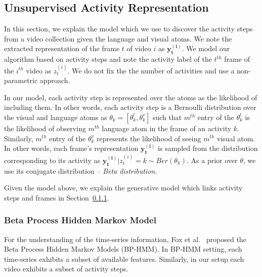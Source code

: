 

\subsection{Unsupervised Activity Representation}
\label{basics}
\label{learning}
In this section, we explain the model which we use to discover the activity steps from a video collection given the language and visual atoms. We note the extracted representation of the frame $t$ of video $i$ as $\mathbf{y^{(i)}_t}$. We model our algorithm based on activity steps and note the activity label of the $t^{th}$ frame of the $i^{th}$ video as $z^{(i)}_t$. We do not fix the the number of activities and use a non-parametric approach.


In our model, each activity step is represented over the atoms as the likelihood of including them. In other words, each activity step is a Bernoulli distribution over the visual and language atoms as $\theta_k=[\theta_k^l,\theta_k^v]$ such that $m^{th}$ entry of the $\theta_k^l$ is the likelihood of observing $m^{th}$ language atom in the frame of an activity $k$. Similarly, $m^{th}$ entry of the $\theta_k^v$ represents the likelihood of seeing $m^{th}$ visual atom. In other words, each frame's representation $\mathbf{y^{(i)}_t}$ is sampled from the distribution corresponding to its activity as \mbox{$\mathbf{y^{(i)}_t}|z^{(i)}_t=k \sim Ber(\theta_k)$}. As a prior over $\theta$, we use its conjugate distribution -- \emph{Beta distribution}.

Given the model above, we explain the generative model which links activity steps and frames in Section~\ref{bphmm}.
 
   \vskip -2mm
\subsubsection{Beta Process Hidden Markov Model}
\label{bphmm}
  \vskip -2mm
  
For the understanding of the time-series information, Fox et al.~\cite{foxBPHMM} proposed the Beta Process Hidden Markov Models (BP-HMM). In BP-HMM setting, each time-series exhibits a subset of available features. Similarly, in our setup each video exhibits a subset of activity steps.


